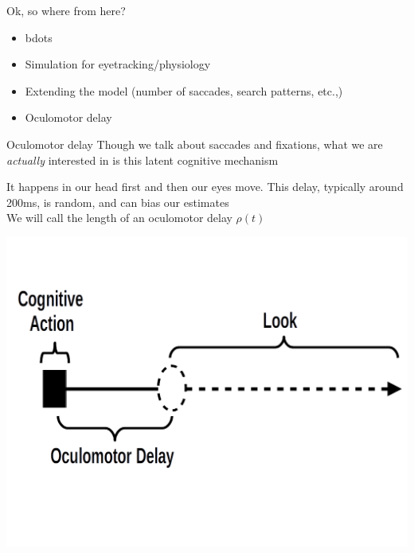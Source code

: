 \documentclass{beamer}
\begin{document}
\begin{frame}{Ok, so where from here?}
%

\begin{itemize}
\item bdots
\item Simulation for eyetracking/physiology
\item Extending the model (number of saccades, search patterns, etc.,)
\item Oculomotor delay
\end{itemize}
\end{frame}

\begin{frame}{Oculomotor delay}
Though we talk about saccades and fixations, what we are \textit{actually} interested in is this latent cognitive mechanism

It happens in our head first and then our eyes move. This delay, typically around 200ms, is random, and can bias our estimates \\

We will call the length of an  oculomotor delay $\rho(t)$

\begin{center}
\includegraphics[scale=0.25]{img/om_delay2.png}
\end{center}

\end{frame}
\end{document}
